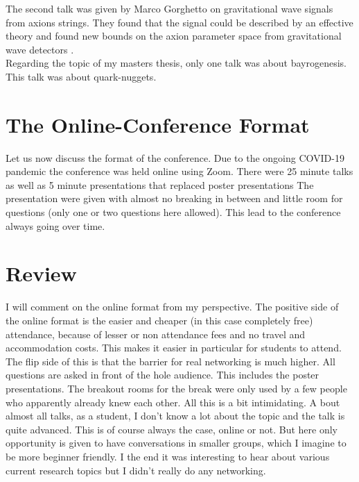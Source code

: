 \documentclass[a4paper]{article}
\begin{document}
\noindent
The second talk was given by Marco Gorghetto on gravitational wave signals
from axions strings. They found that the signal could be described by an effective theory
and found new bounds on the axion parameter space from gravitational wave detectors \cite{Gorghetto_2021}. \\

\noindent
Regarding the topic of my masters thesis, only one talk was about bayrogenesis.
This talk was about quark-nuggets.




\section{The Online-Conference Format}
Let us now discuss the format of the conference.
Due to the ongoing COVID-19 pandemic the conference was held online using Zoom.
There were 25 minute talks as well as 5 minute presentations that replaced poster presentations
The presentation were given with almost no breaking in between and little room for questions (only one or two
questions here allowed). This lead to the conference always going over time.

\section{Review}
I will comment on the online format from my perspective.
The positive side of the online format is the easier and cheaper (in this case completely free)
attendance, because of lesser or non attendance fees and no travel and accommodation costs.
This makes it easier in particular for students to attend.
The flip side of this is that the barrier for real networking is much higher.
All questions are asked in front of the hole audience. This includes the
poster presentations. The breakout rooms for the break were only used by a few people who apparently already knew
each other.
All this is a bit intimidating. A bout almost all
talks, as a student, I don't know a lot about the topic and the talk is quite advanced.
This is of course always the case, online or not. But here only opportunity is given to have
conversations in smaller groups, which I imagine to be more beginner friendly.
I the end it was interesting to hear about various current research topics but
I didn't really do any networking.


\newpage
\printbibliography
\end{document}
